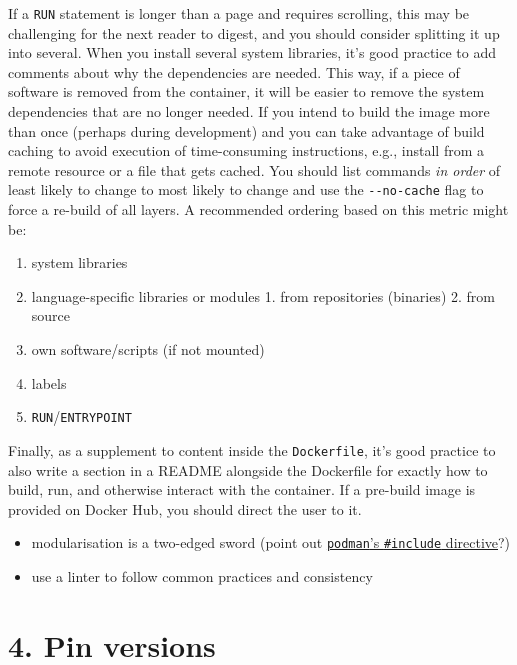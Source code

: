 \documentclass[10pt,letterpaper]{article}
\providecommand{\tightlist}{%
  \setlength{\itemsep}{0pt}\setlength{\parskip}{0pt}}
\begin{document}
If a \texttt{RUN} statement is longer than a page and requires
scrolling, this may be challenging for the next reader to digest, and
you should consider splitting it up into several. When you install
several system libraries, it's good practice to add comments about why
the dependencies are needed. This way, if a piece of software is removed
from the container, it will be easier to remove the system dependencies
that are no longer needed. If you intend to build the image more than
once (perhaps during development) and you can take advantage of build
caching to avoid execution of time-consuming instructions, e.g., install
from a remote resource or a file that gets cached. You should list
commands \emph{in order} of least likely to change to most likely to
change and use the \texttt{-\/-no-cache} flag to force a re-build of all
layers. A recommended ordering based on this metric might be:

\begin{enumerate}
\def\labelenumi{\arabic{enumi}.}
\tightlist
\item
  system libraries
\item
  language-specific libraries or modules 1. from repositories (binaries)
  2. from source
\item
  own software/scripts (if not mounted)
\item
  labels
\item
  \texttt{RUN}/\texttt{ENTRYPOINT}
\end{enumerate}

Finally, as a supplement to content inside the \texttt{Dockerfile}, it's
good practice to also write a section in a README alongside the
Dockerfile for exactly how to build, run, and otherwise interact with
the container. If a pre-build image is provided on Docker Hub, you
should direct the user to it.

\begin{itemize}
\tightlist
\item
  modularisation is a two-edged sword (point out
  \href{https://www.mankier.com/1/podman-build}{\texttt{podman}'s
  \texttt{\#include} directive}?) 
\item
  use a linter to follow common practices and consistency 
\end{itemize}

\hypertarget{pin-versions}{%
\section*{4. Pin versions}\label{pin-versions}}
\end{document}
